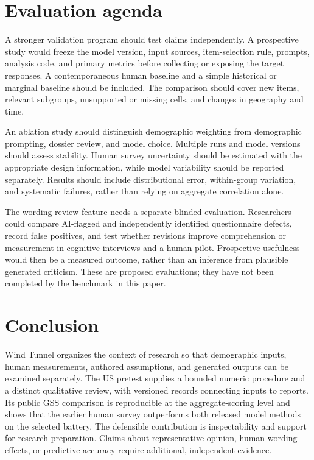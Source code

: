 \documentclass[
  11pt,
]{article}
\let\originalsection\section
\renewcommand{\section}{\Needspace{5\baselineskip}\originalsection}
\begin{document}
\section{Evaluation agenda}\label{evaluation-agenda}

A stronger validation program should test claims independently. A
prospective study would freeze the model version, input sources,
item-selection rule, prompts, analysis code, and primary metrics before
collecting or exposing the target responses. A contemporaneous human
baseline and a simple historical or marginal baseline should be
included. The comparison should cover new items, relevant subgroups,
unsupported or missing cells, and changes in geography and time.

An ablation study should distinguish demographic weighting from
demographic prompting, dossier review, and model choice. Multiple runs
and model versions should assess stability. Human survey uncertainty
should be estimated with the appropriate design information, while model
variability should be reported separately. Results should include
distributional error, within-group variation, and systematic failures,
rather than relying on aggregate correlation alone.

The wording-review feature needs a separate blinded evaluation.
Researchers could compare AI-flagged and independently identified
questionnaire defects, record false positives, and test whether
revisions improve comprehension or measurement in cognitive interviews
and a human pilot. Prospective usefulness would then be a measured
outcome, rather than an inference from plausible generated criticism.
These are proposed evaluations; they have not been completed by the
benchmark in this paper.

\section{Conclusion}\label{conclusion}

Wind Tunnel organizes the context of research so that demographic
inputs, human measurements, authored assumptions, and generated outputs
can be examined separately. The US pretest supplies a bounded numeric
procedure and a distinct qualitative review, with versioned records
connecting inputs to reports. Its public GSS comparison is reproducible
at the aggregate-scoring level and shows that the earlier human survey
outperforms both released model methods on the selected battery. The
defensible contribution is inspectability and support for research
preparation. Claims about representative opinion, human wording effects,
or predictive accuracy require additional, independent evidence.
\end{document}
